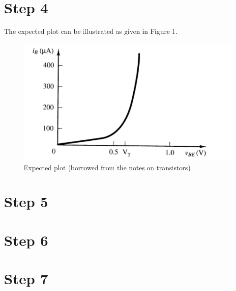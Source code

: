 \documentclass[letterpaper,12pt]{article}
\begin{document}
\section{Step 4}
The expected plot can be illustrated as given in Figure 1.
\begin{figure}[H]
    \centering
    \includegraphics[width=1\textwidth]{4a.png}
    \caption{Expected plot (borrowed from the notes on transistors)}
    \end{figure} 
\section{Step 5}
\section{Step 6}
\section{Step 7}
\end{document}
